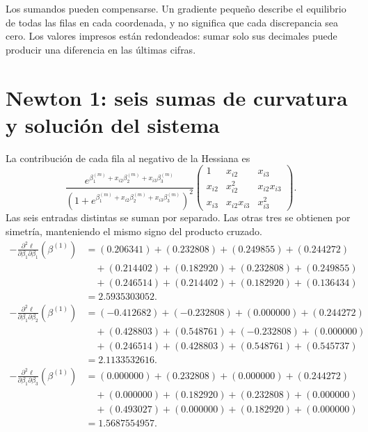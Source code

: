 \documentclass[11pt,a4paper]{article}
\begin{document}
Los sumandos pueden compensarse.
Un gradiente pequeño describe el equilibrio de todas las filas
en cada coordenada, y no significa que cada discrepancia sea cero.
Los valores impresos están redondeados: sumar solo sus decimales
puede producir una diferencia en las últimas cifras.

\clearpage
\section{Newton 1: seis sumas de curvatura y solución del sistema}\label{logit99}
\begingroup\small
\setlength{\abovedisplayskip}{3pt}\setlength{\belowdisplayskip}{3pt}
\setlength{\jot}{2pt}\setlength{\parskip}{3pt}
La contribución de cada fila al negativo de la Hessiana es
\[
\frac{e^{\beta_1^{(m)}+x_{i2}\beta_2^{(m)}+x_{i3}\beta_3^{(m)}}}
{(1+e^{\beta_1^{(m)}+x_{i2}\beta_2^{(m)}+x_{i3}\beta_3^{(m)}})^2}
\begin{pmatrix}
1&x_{i2}&x_{i3}\\
x_{i2}&x_{i2}^2&x_{i2}x_{i3}\\
x_{i3}&x_{i2}x_{i3}&x_{i3}^2
\end{pmatrix}.
\]
Las seis entradas distintas se suman por separado.
Las otras tres se obtienen por simetría, manteniendo el
mismo signo del producto cruzado.
\[
\begin{aligned}
-\frac{\partial^2\ell}{\partial\beta_1\partial\beta_1}(\beta^{(1)})&=(0.206341)+(0.232808)+(0.249855)+(0.244272)\\&\quad+(0.214402)+(0.182920)+(0.232808)+(0.249855)\\&\quad+(0.246514)+(0.214402)+(0.182920)+(0.136434)\\&=2.5935303052.\end{aligned}
\]
\[
\begin{aligned}
-\frac{\partial^2\ell}{\partial\beta_1\partial\beta_2}(\beta^{(1)})&=(-0.412682)+(-0.232808)+(0.000000)+(0.244272)\\&\quad+(0.428803)+(0.548761)+(-0.232808)+(0.000000)\\&\quad+(0.246514)+(0.428803)+(0.548761)+(0.545737)\\&=2.1133532616.\end{aligned}
\]
\[
\begin{aligned}
-\frac{\partial^2\ell}{\partial\beta_1\partial\beta_3}(\beta^{(1)})&=(0.000000)+(0.232808)+(0.000000)+(0.244272)\\&\quad+(0.000000)+(0.182920)+(0.232808)+(0.000000)\\&\quad+(0.493027)+(0.000000)+(0.182920)+(0.000000)\\&=1.5687554957.\end{aligned}
\]
\end{document}
